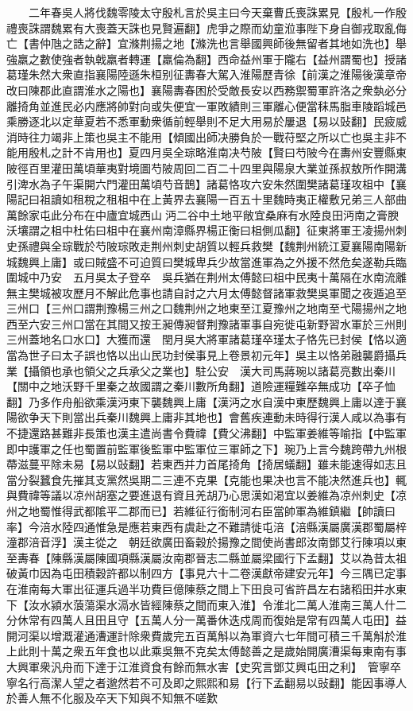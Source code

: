 　　二年春吳人將伐魏零陵太守殷札言於吳主曰今天棄曹氏喪誅累見【殷札一作殷禮喪誅謂魏累有大喪蓋天誅也見賢遍翻】虎爭之際而幼童涖事陛下身自御戎取亂侮亡【書仲虺之誥之辭】宜滌荆揚之地【滌洗也言舉國興師後無留者其地如洗也】舉強羸之數使強者執戟羸者轉運【羸倫為翻】西命益州軍于隴右【益州謂蜀也】授諸葛瑾朱然大衆直指襄陽陸遜朱桓别征夀春大駕入淮陽歷青徐【前漢之淮陽後漢章帝改曰陳郡此直謂淮水之陽也】襄陽夀春困於受敵長安以西務禦蜀軍許洛之衆埶必分離掎角並進民必内應將帥對向或失便宜一軍敗績則三軍離心便當秣馬脂車陵蹈城邑乘勝逐北以定華夏若不悉軍動衆循前輕舉則不足大用易於屢退【易以䜴翻】民疲威消時往力竭非上策也吳主不能用【傾國出師决勝負於一戰苻堅之所以亡也吳主非不能用殷札之計不肯用也】夏四月吳全琮略淮南决芍陂【賢曰芍陂今在夀州安豐縣東陂徑百里灌田萬頃華夷對境圖芍陂周回二百二十四里與陽泉大業並孫叔敖所作開溝引渒水為子午渠開六門灌田萬頃芍音鵲】諸葛恪攻六安朱然圍樊諸葛瑾攻柤中【襄陽記曰祖讀如租稅之租柤中在上黃界去襄陽一百五十里魏時夷正權敷兄弟三人部曲萬餘家屯此分布在中廬宜城西山沔二谷中土地平敞宜桑麻有水陸良田沔南之膏腴沃壤謂之柤中杜佑曰柤中在襄州南漳縣界楊正衡曰柤側瓜翻】征東將軍王凌揚州刺史孫禮與全琮戰於芍陂琮敗走荆州刺史胡質以輕兵救樊【魏荆州統江夏襄陽南陽新城魏興上庸】或曰賊盛不可迫質曰樊城卑兵少故當進軍為之外援不然危矣遂勒兵臨圍城中乃安　五月吳太子登卒　吳兵猶在荆州太傅懿曰柤中民夷十萬隔在水南流離無主樊城被攻歷月不解此危事也請自討之六月太傅懿督諸軍救樊吳軍聞之夜遁追至三州口【三州口謂荆豫楊三州之口魏荆州之地東至江夏豫州之地南至弋陽揚州之地西至六安三州口當在其間又按王昶傳昶督荆豫諸軍事自宛徙屯新野習水軍於三州則三州蓋地名口水口】大獲而還　閏月吳大將軍諸葛瑾卒瑾太子恪先已封侯【恪以適當為世子曰太子誤也恪以出山民功封侯事見上卷景初元年】吳主以恪弟融襲爵攝兵業【攝領也承也領父之兵承父之業也】駐公安　漢大司馬蔣琬以諸葛亮數出秦川【關中之地沃野千里秦之故國謂之秦川數所角翻】道險運糧難卒無成功【卒子恤翻】乃多作舟船欲乘漢沔東下襲魏興上庸【漢沔之水自漢中東歷魏興上庸以達于襄陽欲争天下則當出兵秦川魏興上庸非其地也】會舊疾連動未時得行漢人咸以為事有不捷還路甚難非長策也漢主遣尚書令費禕【費父沸翻】中監軍姜維等喻指【中監軍即中護軍之任也蜀置前監軍後監軍中監軍位三軍師之下】琬乃上言今魏跨帶九州根蔕滋蔓平除未易【易以䜴翻】若東西并力首尾掎角【掎居蟻翻】雖未能速得如志且當分裂蠶食先摧其支黨然吳期二三連不克果【克能也果决也言不能决然進兵也】輒與費禕等議以凉州胡塞之要進退有資且羌胡乃心思漢如渇宜以姜維為凉州刺史【凉州之地蜀惟得武都隂平二郡而已】若維征行銜制河右臣當帥軍為維鎮繼【帥讀曰率】今涪水陸四通惟急是應若東西有虞赴之不難請徙屯涪【涪縣漢屬廣漢郡蜀屬梓潼郡涪音浮】漢主從之　朝廷欲廣田畜穀於揚豫之間使尚書郎汝南鄧艾行陳項以東至夀春【陳縣漢屬陳國項縣漢屬汝南郡晉志二縣並屬梁國行下孟翻】艾以為昔太祖破黃巾因為屯田積穀許都以制四方【事見六十二卷漢獻帝建安元年】今三隅已定事在淮南每大軍出征運兵過半功費巨億陳蔡之間上下田良可省許昌左右諸稻田并水東下【汝水潁水蒗蕩渠水滆水皆經陳蔡之間而東入淮】令淮北二萬人淮南三萬人什二分休常有四萬人且田且守【五萬人分一萬番休迭戍周而復始是常有四萬人屯田】益開河渠以增溉灌通漕運計除衆費歲完五百萬斛以為軍資六七年間可積三千萬斛於淮上此則十萬之衆五年食也以此乘吳無不克矣太傅懿善之是歲始開廣漕渠每東南有事大興軍衆汎舟而下達于江淮資食有餘而無水害【史究言鄧艾興屯田之利】　管寧卒寧名行高潔人望之者邈然若不可及即之熙熙和易【行下孟翻易以䜴翻】能因事導人於善人無不化服及卒天下知與不知無不嗟歎

